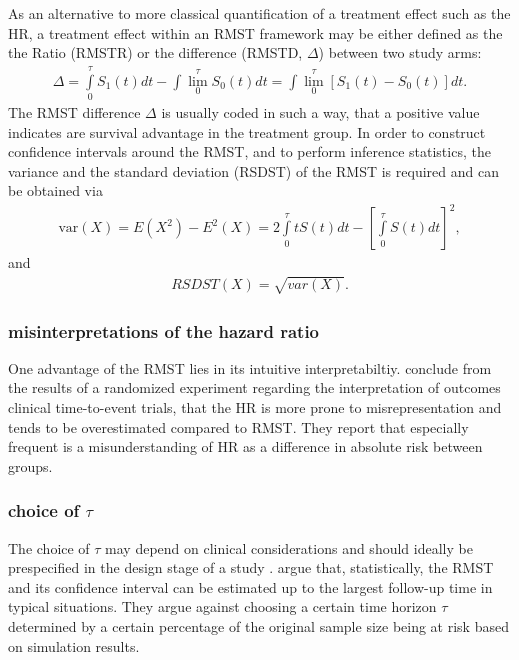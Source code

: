 \documentclass[main.tex]{subfiles}
\begin{document}
As an alternative to more classical quantification of a treatment effect such as the HR, a treatment effect within an RMST framework may be either defined as the the Ratio (RMSTR) or the difference (RMSTD, $\Delta$) between two study arms:
\begin{align}\label{RMSTD}
\Delta = \int\limits_0^\tau S_1(t)dt - \int\lim_0^\tau S_0(t)dt = \int\lim_0^\tau [S_1(t)-S_0(t)]dt.
\end{align}
The RMST difference $\Delta$ is usually coded in such a way, that a positive value indicates are survival advantage in the treatment group. In order to construct confidence intervals around the RMST, and to perform inference statistics, the variance and the standard deviation (RSDST) of the RMST is required and can be obtained via
\begin{align}\label{RMSTVar}
\text{var}(X)= E(X^2)-E^2(X) = 2\int \limits_0^\tau tS(t)dt - \left[ \int\limits_0^\tau S(t)dt\right]^2,
\end{align}
and
\begin{align}\label{labelRMSTequation}
RSDST(X)= \sqrt{var(X)}.
\end{align}

\subsubsection{misinterpretations of the hazard ratio}
One advantage of the RMST lies in its intuitive interpretabiltiy. \textcite{weir2019interpretation} conclude from the results of a randomized experiment regarding the interpretation of outcomes clinical time-to-event trials, that the HR is more prone to misrepresentation and tends to be overestimated compared to RMST. They report that especially frequent is a misunderstanding of HR as a difference in absolute risk between groups. 

\subsubsection{choice of $\tau$}
The choice of $\tau$ may depend on clinical considerations and should ideally be prespecified in the design stage of a study \parencite{Tian2020-cn}. \textcite{Tian2020-cn} argue that, statistically, the RMST and its confidence interval can be estimated up to the largest follow-up time in typical situations. They argue against choosing a certain time horizon $\tau$ determined by a certain percentage of the original sample size being at risk based on simulation results.
\end{document}
